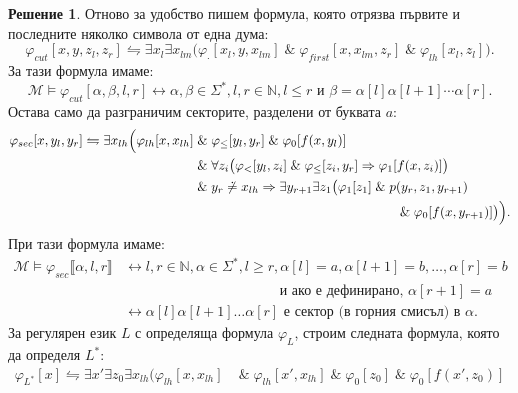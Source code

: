 \documentclass[12pt]{article}
\newcommand{\N}{\mathbb{N}}
\newcommand{\logand}{\; \& \;}
\newcommand{\calM}{\mathcal{M}}
\newcommand{\db}[1]{\llbracket #1 \rrbracket}
\theoremstyle{definition}
\newtheorem*{solution}{Решение}
\begin{document}
\begin{solution}
Отново за удобство пишем формула, която отрязва първите и последните няколко символа от една дума:
\[
  \varphi_{cut}[x, y, z_l, z_r] \leftrightharpoons \exists x_l \exists x_{lm} \big(\varphi_\cdot[x_l, y, x_{lm}] \logand \varphi_{first}[x, x_{lm}, z_r] \logand \varphi_{lh}[x_l, z_l]\big).
\]
За тази формула имаме:
\[
  \calM \models \varphi_{cut}[\alpha, \beta, l, r] \longleftrightarrow \alpha, \beta \in \Sigma^*, l, r \in \N, l \leq r \text{ и }\beta = \alpha[l] \alpha[l + 1] \cdots \alpha[r].
\]
Остава само да разграничим секторите, разделени от буквата $a$:
\begin{align*}
  \varphi_{sec}[x, y_l, y_r] \leftrightharpoons \exists x_{lh} \Bigl(\varphi_{lh}[x, x_{lh}] & \logand \varphi_\leq[y_l, y_r] \logand \varphi_0[f(x, y_l)] \\ 
                                                                                           & \logand \forall z_i \big(\varphi_<[y_l, z_i] \logand \varphi_\leq[z_i, y_r] \Rightarrow \varphi_1[f(x, z_i)]\big) \\ 
                                                                                           & \logand y_r \not \doteq x_{lh} \Rightarrow \exists y_{r + 1} \exists z_1 \big(\varphi_1[z_1] \logand p(y_r, z_1, y_{r + 1}) \\ 
                                                                                           & \hspace*{54mm} \logand \varphi_0[f(x, y_{r + 1})]\big)\Bigl).
\end{align*}
При тази формула имаме:
\begin{align*}
  \calM \models \varphi_{sec}\db{\alpha, l, r} & \longleftrightarrow l, r \in \N, \alpha \in \Sigma^*, l \geq r, \alpha[l] = a, \alpha[l + 1] = b, \dots, \alpha[r] = b \\ 
                                                  & \phantom{\longleftrightarrow blablablablablablablab} \text{ и ако е дефинирано, } \alpha[r + 1] = a \\
                                                  & \longleftrightarrow \alpha[l] \alpha[l + 1] \dots \alpha[r] \text{ е сектор (в горния смисъл) в } \alpha.
\end{align*}
За регулярен език $L$ с определяща формула $\varphi_L$, строим следната формула, която да определя $L^*$:
\begin{align*}
  \varphi_{L^*}[x] \leftrightharpoons \exists x' \exists z_0 \exists x_{lh} \biggl(\varphi_{lh}[x, x_{lh}] & \logand \varphi_{lh}[x', x_{lh}] \logand \varphi_0[z_0] \logand \varphi_0[f(x', z_0)] \\ 

\end{align*}
\end{solution}
\end{document}

